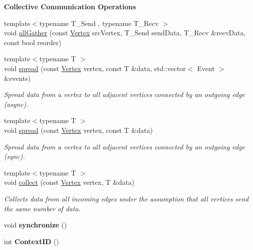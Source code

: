 \begin{Indent}{\bf Collective Communication Operations}
\begin{DoxyCompactItemize}
\item 
{\footnotesize template$<$typename T\+\_\+\+Send , typename T\+\_\+\+Recv $>$ }\\void \hyperlink{structgraybat_1_1Cage_a57b8858bb4ae33204c049c50c1a27aca}{all\+Gather} (const \hyperlink{structgraybat_1_1CommunicationVertex}{Vertex} src\+Vertex, T\+\_\+\+Send send\+Data, T\+\_\+\+Recv \&recv\+Data, const bool reorder)
\item 
{\footnotesize template$<$typename T $>$ }\\void \hyperlink{structgraybat_1_1Cage_ad7530589eef3e5d7dc1e70adb74c75f4}{spread} (const \hyperlink{structgraybat_1_1CommunicationVertex}{Vertex} vertex, const T \&data, std\+::vector$<$ Event $>$ \&events)
\begin{DoxyCompactList}\small\item\em Spread data from a vertex to all adjacent vertices connected by an outgoing edge (async). \end{DoxyCompactList}\item 
{\footnotesize template$<$typename T $>$ }\\void \hyperlink{structgraybat_1_1Cage_aa387169a4a053f30479ff478aa8d5cf8}{spread} (const \hyperlink{structgraybat_1_1CommunicationVertex}{Vertex} vertex, const T \&data)
\begin{DoxyCompactList}\small\item\em Spread data from a vertex to all adjacent vertices connected by an outgoing edge (sync). \end{DoxyCompactList}\item 
{\footnotesize template$<$typename T $>$ }\\void \hyperlink{structgraybat_1_1Cage_a9b7eaa7c2302a32e5408bb92ae4b6f53}{collect} (const \hyperlink{structgraybat_1_1CommunicationVertex}{Vertex} vertex, T \&data)
\begin{DoxyCompactList}\small\item\em Collects data from all incoming edges under the assumption that all vertices send the same number of data. \end{DoxyCompactList}\item 
\hypertarget{structgraybat_1_1Cage_a13a8d9fcfbb52bddb37c882d76e940f9}{}void {\bfseries synchronize} ()\label{structgraybat_1_1Cage_a13a8d9fcfbb52bddb37c882d76e940f9}

\item 
\hypertarget{structgraybat_1_1Cage_a44f5edf7c4ff86661198e53ba20109e0}{}int {\bfseries Context\+I\+D} ()\label{structgraybat_1_1Cage_a44f5edf7c4ff86661198e53ba20109e0}

\end{DoxyCompactItemize}
\end{Indent}
